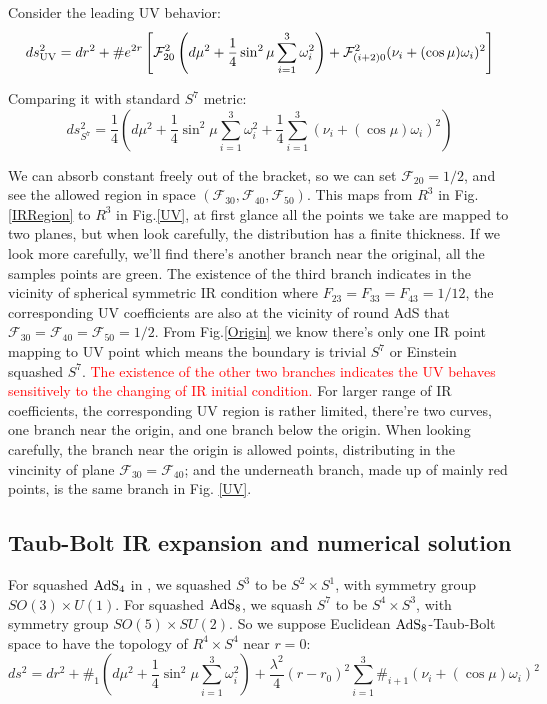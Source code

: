 \documentclass[12pt, a4paper]{article}
\numberwithin{equation}{section}
\newcommand{\be}{\begin{equation}}
\newcommand{\ee}{\end{equation}}
\newcommand{\cF}{\mathcal{F}}
\begin{document}
Consider the leading UV behavior:
\be
ds_{{\rm UV}}^2 = dr^2 + \# e^{2r} \left[\cF_{20}^2\left(d\mu^2 +\frac{1}{4}\sin^2\mu \sum\limits_{i=1}^3 \omega_i^2\right) + \cF_{(i+2)0}^2(\nu_i + (\cos\mu)\omega_i)^2\right]
\ee

Comparing it with standard $S^7$ metric:
\be
ds_{S^7}^2 = \frac{1}{4}\left(d\mu^2 +\frac{1}{4}\sin^2\mu \sum\limits_{i=1}^3 \omega_i^2 + \frac{1}{4} \sum\limits_{i=1}^3 (\nu_i + (\cos\mu)\omega_i)^2\right)
\ee	

We can absorb constant freely out of the bracket, so we can set $\cF_{20} = 1/2$, and see the allowed region in space $(\cF_{30},\cF_{40},\cF_{50})$. This maps from $R^3$ in Fig.\ref{IRRegion} to $R^3$ in Fig.\ref{UV}, at first glance all the points we take are mapped to two planes, but when look carefully, the distribution has a finite thickness. If we look more carefully, we'll find there's another branch near the original, all the samples points are green. The existence of the third branch indicates in the vicinity of spherical symmetric IR condition where $F_{23} = F_{33} = F_{43} = 1/12$, the corresponding UV coefficients are also at the vicinity of round AdS that $\cF_{30} = \cF_{40} = \cF_{50} = 1/2$. From Fig.\ref{Origin} we know there's only one IR point mapping to UV point which means the boundary is trivial $S^7$ or Einstein squashed $S^7$. {\textcolor{red}{The existence of the other two branches indicates the UV behaves sensitively to the changing of IR initial condition.}} For larger range of IR coefficients, the corresponding UV region is rather limited, there're two curves, one branch near the origin, and one branch below the origin. When looking carefully, the branch near the origin is allowed points, distributing in the vincinity of plane $\cF_{30} = \cF_{40}$; and the underneath branch, made up of mainly red points, is the same branch in Fig. \ref{UV}.

	
\subsection{Taub-Bolt IR expansion and numerical solution}

	For squashed ${\rm AdS_4}$ in \cite{Bobev:2016sh}, we squashed $S^3$ to be $S^2\times S^1$, with symmetry group $SO(3)\times U(1)$. For squashed ${\rm AdS_8}$, we squash $S^7$ to be $S^4\times S^3$, with symmetry group $SO(5)\times SU(2)$.\cite{Nilsson:1984es} So we suppose Euclidean ${\rm AdS_8}$-Taub-Bolt space to have the topology of $R^4\times S^4$ near $r = 0$:
\be
	ds^2 = dr^2 + \#_1 \left(d\mu^2 +\frac{1}{4}\sin^2\mu \sum\limits_{i=1}^3 \omega_i^2  \right) + \frac{\lambda^2}{4}(r-r_0)^2\sum\limits_{i=1}^3 \#_{i+1}(\nu_i + (\cos\mu)\omega_i)^2
\ee
\end{document}
